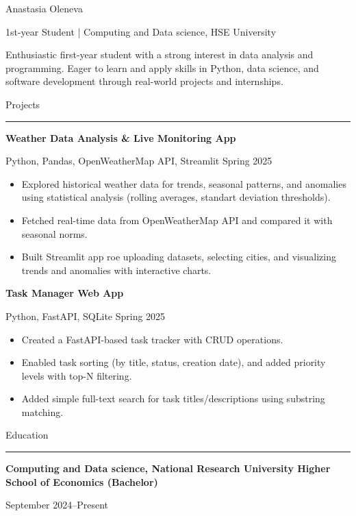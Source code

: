 \documentclass{letter}
\begin{document}
\begin{minipage}[t]{0.58\textwidth}
\setlength{\baselineskip}{1.2\baselineskip}
\vspace{0.3cm}
{\huge Anastasia Oleneva}

{\large 1st-year Student | Computing and Data science, HSE University}

\vspace{0.5cm}
 
Enthusiastic first-year student with a strong interest in data analysis and programming. Eager to learn and apply skills in Python, data science, and software development through real-world projects and internships.

\vspace{0.5cm}

{\large Projects}
\rule{\linewidth}{0.4pt}

{\large \textbf{Weather Data Analysis \& Live Monitoring App}}

{\small Python, Pandas, OpenWeatherMap API, Streamlit \hfill Spring 2025}

\begin{itemize}
    \item Explored historical weather data for trends, seasonal patterns, and anomalies using statistical analysis (rolling averages, standart deviation thresholds).
    \item Fetched real-time data from OpenWeatherMap API and compared it with seasonal norms.
    \item Built Streamlit app roe uploading datasets, selecting cities, and visualizing trends and anomalies with interactive charts.
\end{itemize}

\vspace{0.2cm}

{\large \textbf{Task Manager Web App}}

{\small Python, FastAPI, SQLite \hfill Spring 2025}

\begin{itemize}
    \item Created a FastAPI-based task tracker with CRUD operations.
    \item Enabled task sorting (by title, status, creation date), and added priority levels with top-N filtering.
    \item Added simple full-text search for task titles/descriptions using substring matching.
\end{itemize}


{\large Education}
\rule{\linewidth}{0.4pt}

{\large \textbf{Computing and Data science, National Research University Higher School of Economics (Bachelor)}}

{\small September 2024--Present}



\end{minipage}
\end{document}
